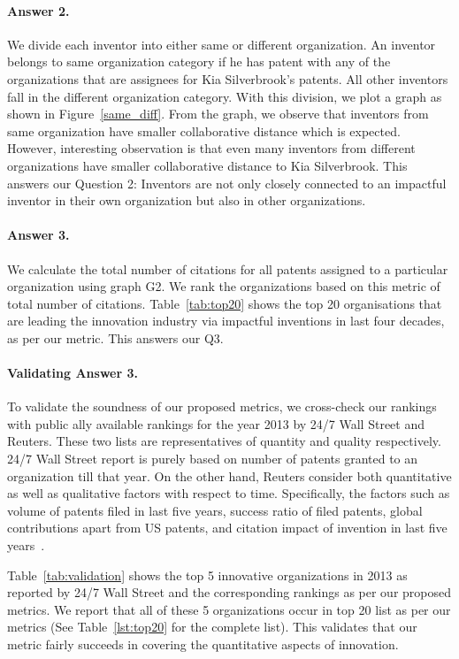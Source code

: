 \paragraph{Answer 2.}
We divide each inventor into either same 
or different organization. An inventor belongs to 
 same organization category if he has patent with any of the organizations that are 
assignees for Kia Silverbrook's patents. All other inventors fall in the different
organization category. With this division, we plot a graph as shown in Figure~\ref{same_diff}.
From the graph, we observe that inventors from same organization have
smaller collaborative distance which is expected. However, interesting observation is that
even many inventors from different organizations have smaller collaborative distance to Kia Silverbrook. 
This answers our Question 2:
Inventors are not only closely connected to an impactful
inventor in their own organization but also in other organizations.

\paragraph{Answer 3.}
We calculate the total number of citations for all patents assigned to a particular organization using graph G2. We rank the organizations based on this metric of total number of citations. Table~\ref{tab:top20} shows the top 20 organisations that are leading the innovation industry via impactful inventions in last four decades, as per our metric. 
This answers our Q3. 

\paragraph{Validating Answer 3.}
To validate the soundness of our proposed metrics, we cross-check our rankings
with public ally available rankings for the year 2013 by 24/7 Wall Street and
Reuters. These two lists are representatives of quantity and quality
respectively.  24/7 Wall Street report is purely based on number of patents
granted to an organization till that year.  On the other hand, Reuters
consider both quantitative as well as qualitative factors with respect to
time. Specifically, the factors such as volume of patents filed in last five
years, success ratio of filed patents, global contributions apart from US
patents, and citation impact of invention in last five years~\cite{reuters-method}.

Table~\ref{tab:validation} shows the top 5 innovative organizations in 2013 as
reported by 24/7 Wall Street and the corresponding rankings as per our
proposed metrics. We report that all of these 5 organizations occur in top 20
list as per our metrics (See Table~\ref{lst:top20} for the complete list).
This validates that our metric fairly succeeds in covering the quantitative
aspects of innovation.

